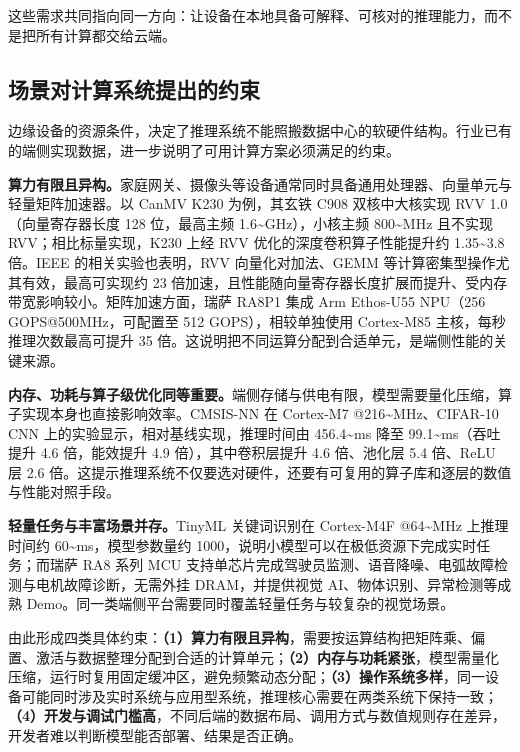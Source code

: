 这些需求共同指向同一方向：让设备在本地具备可解释、可核对的推理能力，而不是把所有计算都交给云端。

\subsection{场景对计算系统提出的约束}
边缘设备的资源条件，决定了推理系统不能照搬数据中心的软硬件结构。行业已有的端侧实现数据，进一步说明了可用计算方案必须满足的约束。\cite{k230report,ra8p1,rvvcnn,k230pytorch,cmsisnn,tinyml,ra8scenario}

\textbf{算力有限且异构。}家庭网关、摄像头等设备通常同时具备通用处理器、向量单元与轻量矩阵加速器。以 CanMV K230 为例，其玄铁 C908 双核中大核实现 RVV 1.0（向量寄存器长度 128 位，最高主频 1.6\textasciitilde GHz），小核主频 800\textasciitilde MHz 且不实现 RVV；相比标量实现，K230 上经 RVV 优化的深度卷积算子性能提升约 1.35\textasciitilde 3.8 倍。IEEE 的相关实验也表明，RVV 向量化对加法、GEMM 等计算密集型操作尤其有效，最高可实现约 23 倍加速，且性能随向量寄存器长度扩展而提升、受内存带宽影响较小。矩阵加速方面，瑞萨 RA8P1 集成 Arm Ethos-U55 NPU（256 GOPS@500MHz，可配置至 512 GOPS），相较单独使用 Cortex-M85 主核，每秒推理次数最高可提升 35 倍。这说明把不同运算分配到合适单元，是端侧性能的关键来源。\cite{k230report,k230pytorch,rvvcnn,ra8p1}

\textbf{内存、功耗与算子级优化同等重要。}端侧存储与供电有限，模型需要量化压缩，算子实现本身也直接影响效率。CMSIS-NN 在 Cortex-M7 @216\textasciitilde MHz、CIFAR-10 CNN 上的实验显示，相对基线实现，推理时间由 456.4\textasciitilde ms 降至 99.1\textasciitilde ms（吞吐提升 4.6 倍，能效提升 4.9 倍），其中卷积层提升 4.6 倍、池化层 5.4 倍、ReLU 层 2.6 倍。这提示推理系统不仅要选对硬件，还要有可复用的算子库和逐层的数值与性能对照手段。\cite{cmsisnn}

\textbf{轻量任务与丰富场景并存。}TinyML 关键词识别在 Cortex-M4F @64\textasciitilde MHz 上推理时间约 60\textasciitilde ms，模型参数量约 1000，说明小模型可以在极低资源下完成实时任务；而瑞萨 RA8 系列 MCU 支持单芯片完成驾驶员监测、语音降噪、电弧故障检测与电机故障诊断，无需外挂 DRAM，并提供视觉 AI、物体识别、异常检测等成熟 Demo。同一类端侧平台需要同时覆盖轻量任务与较复杂的视觉场景。\cite{tinyml,ra8scenario}

由此形成四类具体约束：\textbf{（1）算力有限且异构}，需要按运算结构把矩阵乘、偏置、激活与数据整理分配到合适的计算单元；\textbf{（2）内存与功耗紧张}，模型需量化压缩，运行时复用固定缓冲区，避免频繁动态分配；\textbf{（3）操作系统多样}，同一设备可能同时涉及实时系统与应用型系统，推理核心需要在两类系统下保持一致；\textbf{（4）开发与调试门槛高}，不同后端的数据布局、调用方式与数值规则存在差异，开发者难以判断模型能否部署、结果是否正确。

